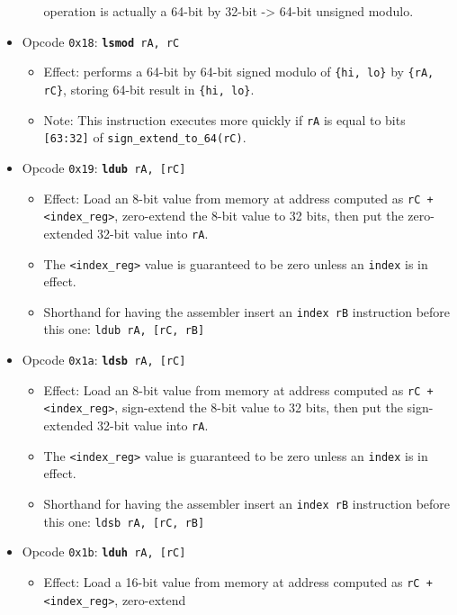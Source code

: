 \documentclass{article}
\begin{document}
\begin{itemize}
\begin{itemize}
			operation is actually a 64-bit by 32-bit -> 64-bit unsigned
			modulo.
		\end{itemize}
		\item Opcode \texttt{0x18}:
			\texttt{\textbf{lsmod} rA, rC}
		\begin{itemize}
			\item Effect:  performs a 64-bit by 64-bit signed modulo of
			\texttt{\{hi, lo\}} by \texttt{\{rA, rC\}}, storing 64-bit
			result in \texttt{\{hi, lo\}}.
			\item Note:  This instruction executes more quickly if
			\texttt{rA} is equal to bits \texttt{[63:32]} of
			\texttt{sign\_extend\_to\_64(rC)}.
		\end{itemize}
		\item Opcode \texttt{0x19}:
			\texttt{\textbf{ldub} rA, [rC]}
		\begin{itemize}
			\item Effect:  Load an 8-bit value from memory at address
			computed as \texttt{rC + <index\_reg>}, zero-extend
			the 8-bit value to 32 bits, then put the zero-extended 32-bit
			value into \texttt{rA}.
			\item The \texttt{<index\_reg>} value is guaranteed to be zero
			unless an \texttt{index} is in effect.
			\item Shorthand for having the assembler insert an
			\texttt{index rB} instruction before this one:
				\texttt{ldub rA, [rC, rB]}
		\end{itemize}
		\item Opcode \texttt{0x1a}:
			\texttt{\textbf{ldsb} rA, [rC]}
		\begin{itemize}
			\item Effect:  Load an 8-bit value from memory at address
			computed as \texttt{rC + <index\_reg>}, sign-extend
			the 8-bit value to 32 bits, then put the sign-extended 32-bit
			value into \texttt{rA}.
			\item The \texttt{<index\_reg>} value is guaranteed to be zero
			unless an \texttt{index} is in effect.
			\item Shorthand for having the assembler insert an
			\texttt{index rB} instruction before this one:
				\texttt{ldsb rA, [rC, rB]}
		\end{itemize}
		\item Opcode \texttt{0x1b}:
			\texttt{\textbf{lduh} rA, [rC]}
		\begin{itemize}
			\item Effect:  Load a 16-bit value from memory at address
			computed as \texttt{rC + <index\_reg>}, zero-extend

\end{itemize}
\end{itemize}
\end{document}
